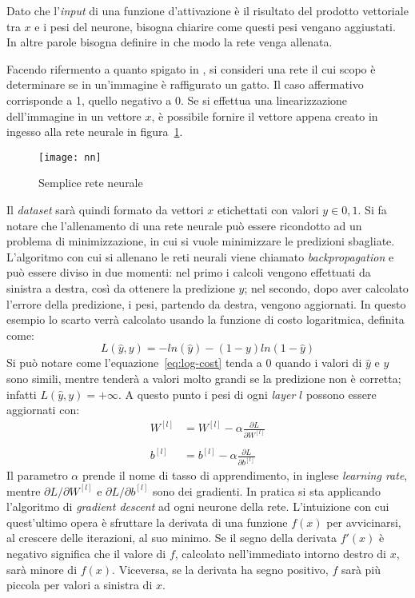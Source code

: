 Dato che l'\textit{input} di una funzione d'attivazione è il risultato del prodotto vettoriale tra $x$ e i pesi del neurone, bisogna chiarire come questi pesi vengano aggiustati.
In altre parole bisogna definire in che modo la rete venga allenata.

Facendo rifermento a quanto spigato in \cite{ng_deep_learning}, si consideri una rete il cui scopo è determinare se in un'immagine è raffigurato un gatto.
Il caso affermativo corrisponde a 1, quello negativo a 0.
Se si effettua una linearizzazione dell'immagine in un vettore $x$, è possibile fornire il vettore appena creato in ingesso alla rete neurale in figura~\ref{fig:nn}.
\begin{figure}[ht]
  \begin{center}
    \centering\texttt{[image: nn]}
  \end{center}
  \caption{Semplice rete neurale}
  \label{fig:nn}
\end{figure}
Il \textit{dataset} sarà quindi formato da vettori $x$ etichettati con valori $y \in {0,1}$.
Si fa notare che l'allenamento di una rete neurale può essere ricondotto ad un problema di minimizzazione, in cui si vuole minimizzare le predizioni sbagliate.
L'algoritmo con cui si allenano le reti neurali viene chiamato \textit{backpropagation} e può essere diviso in due momenti:
nel primo i calcoli vengono effettuati da sinistra a destra, così da ottenere la predizione $\hat y$;
nel secondo, dopo aver calcolato l'errore della predizione, i pesi, partendo da destra, vengono aggiornati.
In questo esempio lo scarto verrà calcolato usando la funzione di costo logaritmica, definita come:
\begin{equation} \label{eq:log-cost}
  L(\hat y, y) = - ln(\hat y) - (1-y) ln(1- \hat y)
\end{equation}
Si può notare come l'equazione~\ref{eq:log-cost} tenda a 0 quando i valori di $\hat y$ e $y$ sono simili, mentre tenderà a valori molto grandi se la predizione non è corretta; infatti $L(\hat y, y)= + \infty$.
A questo punto i pesi di ogni \textit{layer} $l$ possono essere aggiornati con:
\begin{align} \label{eq:grad-desc}
  W^{[l]} &= W^{[l]} - \alpha \frac{\partial L}{\partial W^{[l]}} \\ \\
  b^{[l]} &= b^{[l]} - \alpha \frac{\partial L}{\partial b^{[l]}}
\end{align}
Il parametro $\alpha$ prende il nome di tasso di apprendimento, in inglese \textit{learning rate}, mentre $\partial L / \partial W^{[l]} $ e $\partial L / \partial b^{[l]}$ sono dei gradienti.
In pratica si sta applicando l'algoritmo di \textit{gradient descent} ad ogni neurone della rete.
L'intuizione con cui quest'ultimo opera è sfruttare la derivata di una funzione $f(x)$ per avvicinarsi, al crescere delle iterazioni, al suo minimo.
Se il segno della derivata $f'(x)$ è negativo significa che il valore di $f$, calcolato nell'immediato intorno destro di $x$, sarà minore di $f(x)$.
Viceversa, se la derivata ha segno positivo, $f$ sarà più piccola per valori a sinistra di $x$.

